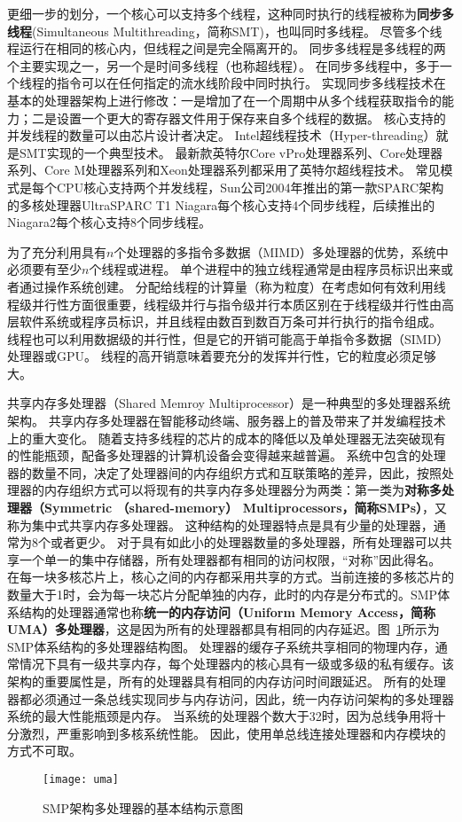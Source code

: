更细一步的划分，一个核心可以支持多个线程，这种同时执行的线程被称为\textbf{同步多线程}(Simultaneous Multithreading，简称SMT)，也叫同时多线程。
尽管多个线程运行在相同的核心内，但线程之间是完全隔离开的。
同步多线程是多线程的两个主要实现之一，另一个是时间多线程（也称超线程）。
在同步多线程中，多于一个线程的指令可以在任何指定的流水线阶段中同时执行。
实现同步多线程技术在基本的处理器架构上进行修改：一是增加了在一个周期中从多个线程获取指令的能力；二是设置一个更大的寄存器文件用于保存来自多个线程的数据。
核心支持的并发线程的数量可以由芯片设计者决定。
Intel超线程技术（Hyper-threading）就是SMT实现的一个典型技术\cite{marr2002hyper}。
最新款英特尔Core vPro处理器系列\cite{samson2005interface}、Core处理器系列\cite{lempel20112nd}、Core M处理器系列和Xeon处理器系列\cite{chang200765}都采用了英特尔超线程技术。
常见模式是每个CPU核心支持两个并发线程，Sun公司2004年推出的第一款SPARC架构的多核处理器UltraSPARC T1 Niagara每个核心支持4个同步线程\cite{kongetira2005niagara}，后续推出的Niagara2每个核心支持8个同步线程。

为了充分利用具有$n$个处理器的多指令多数据（MIMD）多处理器的优势，系统中必须要有至少$n$个线程或进程。
单个进程中的独立线程通常是由程序员标识出来或者通过操作系统创建。
分配给线程的计算量（称为粒度）在考虑如何有效利用线程级并行性方面很重要，线程级并行与指令级并行本质区别在于线程级并行性由高层软件系统或程序员标识，并且线程由数百到数百万条可并行执行的指令组成。
线程也可以利用数据级的并行性，但是它的开销可能高于单指令多数据（SIMD）处理器或GPU\cite{shi2012vcuda}。
线程的高开销意味着要充分的发挥并行性，它的粒度必须足够大。

共享内存多处理器（Shared Memroy Multiprocessor）是一种典型的多处理器系统架构。
共享内存多处理器在智能移动终端、服务器上的普及带来了并发编程技术上的重大变化。
随着支持多线程的芯片的成本的降低以及单处理器无法突破现有的性能瓶颈，配备多处理器的计算机设备会变得越来越普遍。
系统中包含的处理器的数量不同，决定了处理器间的内存组织方式和互联策略的差异，因此，按照处理器的内存组织方式可以将现有的共享内存多处理器分为两类：第一类为\textbf{对称多处理器（Symmetric （shared-memory） Multiprocessors，简称SMPs）}，又称为集中式共享内存多处理器。
	这种结构的处理器特点是具有少量的处理器，通常为8个或者更少。
	对于具有如此小的处理器数量的多处理器，所有处理器可以共享一个单一的集中存储器，所有处理器都有相同的访问权限，“对称”因此得名。
	在每一块多核芯片上，核心之间的内存都采用共享的方式。当前连接的多核芯片的数量大于1时，会为每一块芯片分配单独的内存，此时的内存是分布式的。SMP体系结构的处理器通常也称\textbf{统一的内存访问（Uniform Memory Access，简称UMA）多处理器}，这是因为所有的处理器都具有相同的内存延迟。图~\ref{fig:uma}所示为SMP体系结构的多处理器结构图。
	处理器的缓存子系统共享相同的物理内存，通常情况下具有一级共享内存，每个处理器内的核心具有一级或多级的私有缓存。该架构的重要属性是，所有的处理器具有相同的内存访问时间跟延迟。
	所有的处理器都必须通过一条总线实现同步与内存访问，因此，统一内存访问架构的多处理器系统的最大性能瓶颈是内存。
	当系统的处理器个数大于32时，因为总线争用将十分激烈，严重影响到多核系统性能。
	因此，使用单总线连接处理器和内存模块的方式不可取。
\begin{figure}
\centering
\texttt{[image: uma]}
\caption{SMP架构多处理器的基本结构示意图}
\label{fig:uma}
\end{figure}
	
